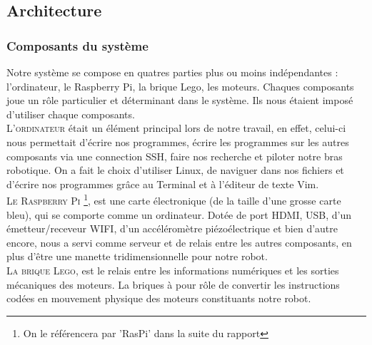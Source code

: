 \documentclass[twoside,twocolumn, 16pt]{article}
\begin{document}
\subsection{Architecture}
\subsubsection{Composants du système}
Notre système se compose en quatres parties plus ou moins indépendantes : l’ordinateur, le Raspberry Pi, la brique Lego, les moteurs. Chaques composants joue un rôle particulier et déterminant dans le système. Ils nous étaient imposé d’utiliser chaque composants. \\
\indent \textsc{L'ordinateur} était un élément principal lors de notre travail, en effet, celui-ci nous permettait d’écrire nos programmes, écrire les programmes sur les autres composants via une connection SSH, faire nos recherche et piloter notre bras robotique. On a fait le choix d’utiliser Linux, de naviguer dans nos fichiers et d’écrire nos programmes grâce au Terminal et à l’éditeur de texte Vim. \\
\indent \textsc{Le Raspberry Pi} \footnote{On le référencera par 'RasPi' dans la suite du rapport}, est une carte électronique (de la taille d’une grosse carte bleu), qui se comporte comme un ordinateur. Dotée de port HDMI, USB, d’un émetteur/receveur WIFI, d’un accéléromètre piézoélectrique et bien d’autre encore, nous a servi comme serveur et de relais entre les autres composants, en plus d’être une manette tridimensionnelle pour notre robot. \\ 
\indent \textsc{La brique Lego}, est le relais entre les informations numériques et les sorties mécaniques des moteurs. La briques à pour rôle de convertir les instructions codées en mouvement physique des moteurs constituants notre robot.
\vspace{-1cm}
\end{document}
